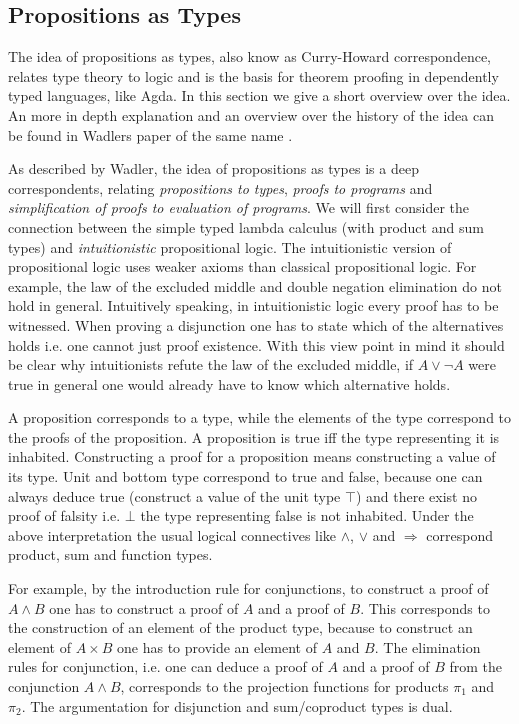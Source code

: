 \subsection{Propositions as Types}

The idea of propositions as types, also know as Curry-Howard correspondence,
relates type theory to logic and is the basis for theorem proofing in
dependently typed languages, like Agda.
In this section we give a short overview over the idea.
An more in depth explanation and an overview over the history of the idea can be
found in Wadlers paper of the same name \cite{DBLP:journals/cacm/Wadler15}.

As described by Wadler, the idea of propositions as types is a deep
correspondents, relating \textit{propositions to types}, \textit{proofs to
programs} and \textit{simplification of proofs to evaluation of programs}.
We will first consider the connection between the simple typed lambda calculus
(with product and sum types) and \textit{intuitionistic} propositional logic.
The intuitionistic version of propositional logic uses weaker axioms than
classical propositional logic.
For example, the law of the excluded middle and double negation elimination do
not hold in general.
Intuitively speaking, in intuitionistic logic every proof has to be witnessed.
When proving a disjunction one has to state which of the alternatives holds i.e.
one cannot just proof existence.
With this view point in mind it should be clear why intuitionists refute the law
of the excluded middle, if $A \vee \neg A$ were true in general one would
already have to know which alternative holds.

A proposition corresponds to a type, while the elements of the type correspond
to the proofs of the proposition.
A proposition is true iff the type representing it is inhabited.
Constructing a proof for a proposition means constructing a value of its type.
Unit and bottom type correspond to true and false, because one can always deduce
true (construct a value of the unit type $\top$) and there exist no proof of
falsity i.e. $\bot$ the type representing false is not inhabited.
Under the above interpretation the usual logical connectives like $\wedge$,
$\vee$ and $\Rightarrow$ correspond product, sum and function types.

For example, by the introduction rule for conjunctions, to construct a proof of
$A\wedge B$ one has to construct a proof of $A$ and a proof of $B$.
This corresponds to the construction of an element of the product type, because
to construct an element of $A\times B$ one has to provide an element of $A$ and
$B$.
The elimination rules for conjunction, i.e. one can deduce a proof of $A$ and a
proof of $B$ from the conjunction $A \wedge B$, corresponds to the projection
functions for products $\pi_1$ and $\pi_2$.
The argumentation for disjunction and sum/coproduct types is dual.

